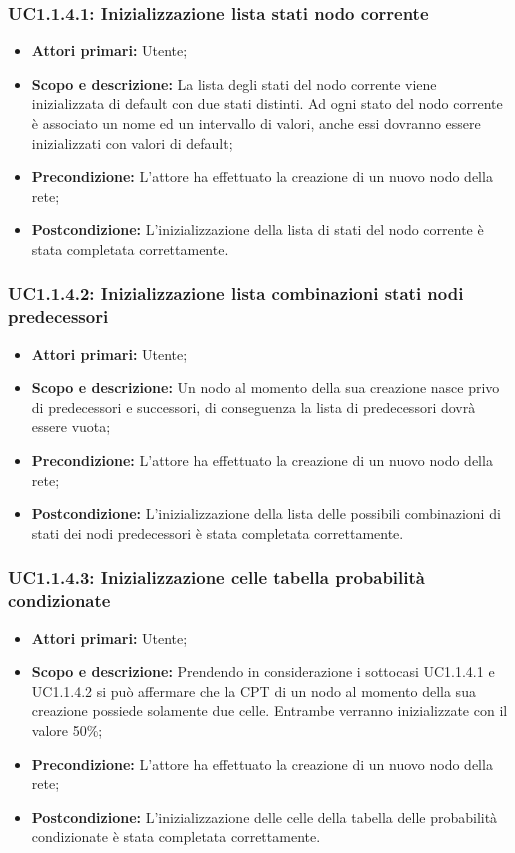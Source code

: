 \subsubsection{UC1.1.4.1: Inizializzazione lista stati nodo corrente} 
\begin{itemize} 
	\item{\textbf{Attori primari:} Utente;} 
	\item{\textbf{Scopo e descrizione:} La lista degli stati del nodo corrente viene inizializzata di default con due stati distinti. Ad ogni stato del nodo corrente è associato un nome ed un intervallo di valori, anche essi dovranno essere inizializzati con valori di default;} 
	\item{\textbf{Precondizione:} L'attore ha effettuato la creazione di un nuovo nodo della rete;} 
	\item{\textbf{Postcondizione:} L'inizializzazione della lista di stati del nodo corrente è stata completata correttamente.} 
\end{itemize} 
\subsubsection{UC1.1.4.2: Inizializzazione lista combinazioni stati nodi predecessori} 
\begin{itemize} 
	\item{\textbf{Attori primari:} Utente;} 
	\item{\textbf{Scopo e descrizione:} Un nodo al momento della sua creazione nasce privo di predecessori e successori, di conseguenza la lista di predecessori dovrà essere vuota;} 
	\item{\textbf{Precondizione:} L'attore ha effettuato la creazione di un nuovo nodo della rete;} 
	\item{\textbf{Postcondizione:} L'inizializzazione della lista delle possibili combinazioni di stati dei nodi predecessori è stata completata correttamente.} 
\end{itemize} 
\subsubsection{UC1.1.4.3: Inizializzazione celle tabella probabilità condizionate} 
\begin{itemize} 
	\item{\textbf{Attori primari:} Utente;} 
	\item{\textbf{Scopo e descrizione:} Prendendo in considerazione i sottocasi UC1.1.4.1 e UC1.1.4.2 si può affermare che la CPT di un nodo al momento della sua creazione possiede solamente due celle. Entrambe verranno inizializzate con il valore 50\%;} 
	\item{\textbf{Precondizione:} L'attore ha effettuato la creazione di un nuovo nodo della rete;} 
	\item{\textbf{Postcondizione:} L'inizializzazione delle celle della tabella delle probabilità condizionate è stata completata correttamente.} 
\end{itemize} 
